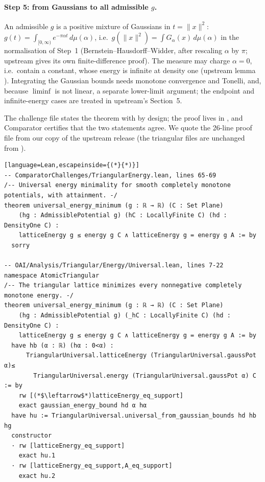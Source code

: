 \paragraph{Step 5: from Gaussians to all admissible $g$.} An admissible $g$ is a positive mixture of Gaussians in
$t=\|x\|^2$: $g(t)=\int_{[0,\infty)}e^{-\pi\alpha t}\,d\mu(\alpha)$, i.e.\ $g(\|x\|^2)=\int G_\alpha(x)\,d\mu(\alpha)$
in the normalisation of Step~1 (Bernstein--Hausdorff--Widder, after rescaling $\alpha$ by $\pi$; upstream gives its own
finite-difference proof). The measure may charge $\alpha=0$, i.e.\ contain a constant, whose energy is infinite at
density one (upstream lemma ). Integrating the Gaussian bounds needs monotone convergence and Tonelli,
and, because $\liminf$ is not linear, a separate lower-limit argument; the endpoint and infinite-energy cases are treated
in upstream's Section~5.

\begin{leanbox}
The challenge file states the theorem with  by design; the proof lives in
, and Comparator certifies that the two statements agree. We quote
the 26-line proof file from our copy of the upstream release  (the triangular files are unchanged
from ).
\begin{lstlisting}[language=Lean,escapeinside={(*}{*)}]
-- ComparatorChallenges/TriangularEnergy.lean, lines 65-69
/-- Universal energy minimality for smooth completely monotone potentials, with attainment. -/
theorem universal_energy_minimum (g : ℝ → ℝ) (C : Set Plane)
    (hg : AdmissiblePotential g) (hC : LocallyFinite C) (hd : DensityOne C) :
    latticeEnergy g ≤ energy g C ∧ latticeEnergy g = energy g A := by
  sorry

-- OAI/Analysis/Triangular/Energy/Universal.lean, lines 7-22
namespace AtomicTriangular
/-- The triangular lattice minimizes every nonnegative completely monotone energy. -/
theorem universal_energy_minimum (g : ℝ → ℝ) (C : Set Plane)
    (hg : AdmissiblePotential g) (_hC : LocallyFinite C) (hd : DensityOne C) :
    latticeEnergy g ≤ energy g C ∧ latticeEnergy g = energy g A := by
  have hb (α : ℝ) (hα : 0<α) :
      TriangularUniversal.latticeEnergy (TriangularUniversal.gaussPot α)≤
        TriangularUniversal.energy (TriangularUniversal.gaussPot α) C := by
    rw [(*$\leftarrow$*)latticeEnergy_eq_support]
    exact gaussian_energy_bound hd α hα
  have hu := TriangularUniversal.universal_from_gaussian_bounds hd hb hg
  constructor
  · rw [latticeEnergy_eq_support]
    exact hu.1
  · rw [latticeEnergy_eq_support,A_eq_support]
    exact hu.2
\end{lstlisting}
\end{leanbox}

